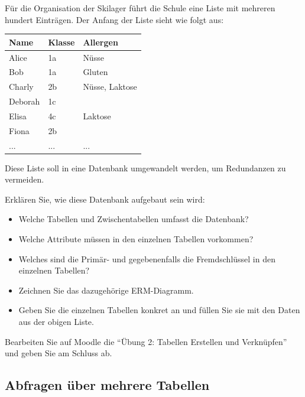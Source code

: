 \begin{myexercise}
  Für die Organisation der Skilager führt die Schule eine Liste mit mehreren hundert Einträgen. Der Anfang der Liste sieht wie folgt aus:

  \begin{tabular}{l|l|l}
    Name	& Klasse&	Allergen \\ \hline 
    Alice	&1a	&Nüsse \\
    Bob	&1a	&Gluten \\
    Charly	&2b	&Nüsse, Laktose \\
    Deborah	&1c&	 \\
    Elisa	&4c	&Laktose \\
    Fiona	&2b	& \\
    ...	&...	&...
  \end{tabular}


Diese Liste soll in eine Datenbank umgewandelt werden, um Redundanzen zu vermeiden.

Erklären Sie, wie diese Datenbank aufgebaut sein wird:

\begin{itemize}
  \item Welche Tabellen und Zwischentabellen umfasst die Datenbank?
  \item Welche Attribute müssen in den einzelnen Tabellen vorkommen?
  \item Welches sind die Primär- und gegebenenfalls die Fremdschlüssel in den einzelnen Tabellen?
  \item Zeichnen Sie das dazugehörige ERM-Diagramm.
  \item Geben Sie die einzelnen Tabellen konkret an und füllen Sie sie mit den Daten aus der obigen Liste.
\end{itemize}
\end{myexercise}


\begin{mysubmission}
  Bearbeiten Sie auf Moodle die ``Übung 2: Tabellen Erstellen und Verknüpfen'' und geben Sie am Schluss ab.
\end{mysubmission}


















\subsection{Abfragen über mehrere Tabellen}

